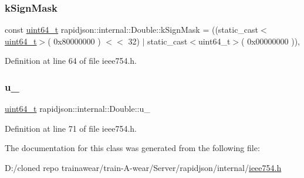 \subsubsection{\texorpdfstring{kSignMask}{kSignMask}}
{\footnotesize\ttfamily const \mbox{\hyperlink{stdint_8h_aec6fcb673ff035718c238c8c9d544c47}{uint64\+\_\+t}} rapidjson\+::internal\+::\+Double\+::k\+Sign\+Mask = ((static\+\_\+cast$<$\mbox{\hyperlink{stdint_8h_aec6fcb673ff035718c238c8c9d544c47}{uint64\+\_\+t}}$>$( 0x80000000 ) $<$$<$ 32) $\vert$ static\+\_\+cast$<$uint64\+\_\+t$>$( 0x00000000 ))\hspace{0.3cm}{\ttfamily [static]}, {\ttfamily [private]}}



Definition at line 64 of file ieee754.\+h.

\mbox{\label{classrapidjson_1_1internal_1_1_double_a1f983c37796c260a9493b49d79f85516}} 
\subsubsection{\texorpdfstring{u\_}{u\_}}
{\footnotesize\ttfamily \mbox{\hyperlink{stdint_8h_aec6fcb673ff035718c238c8c9d544c47}{uint64\+\_\+t}} rapidjson\+::internal\+::\+Double\+::u\+\_\+}



Definition at line 71 of file ieee754.\+h.



The documentation for this class was generated from the following file\+:\begin{DoxyCompactItemize}
\item 
D\+:/cloned repo trainawear/train-\/\+A-\/wear/\+Server/rapidjson/internal/\mbox{\hyperlink{ieee754_8h}{ieee754.\+h}}\end{DoxyCompactItemize}
